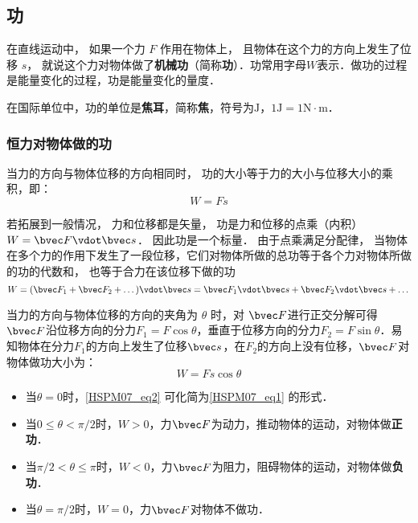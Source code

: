 
\begin{issues}
\issueDraft
\issueTODO
\end{issues}

\subsection{功}

在直线运动中， 如果一个力 $F$ 作用在物体上， 且物体在这个力的方向上发生了位移 $s$， 就说这个力对物体做了\textbf{机械功}（简称\textbf{功}）．功常用字母$W$表示．做功的过程是能量变化的过程，功是能量变化的量度．

在国际单位中，功的单位是\textbf{焦耳}，简称\textbf{焦}，符号为$\mathrm{J}$，$1\mathrm{J}=1\mathrm{N \cdot m}$．

\subsubsection{恒力对物体做的功}

当力的方向与物体位移的方向相同时， 功的大小等于力的大小与位移大小的乘积，即：
\begin{equation}\label{HSPM07_eq1}
W=Fs
\end{equation}

若拓展到一般情况， 力和位移都是矢量， 功是力和位移的点乘（内积） $W = \bvec F \vdot \bvec s$． 因此功是一个标量． 由于点乘满足分配律， 当物体在多个力的作用下发生了一段位移，它们对物体所做的总功等于各个力对物体所做的功的代数和， 也等于合力在该位移下做的功
\begin{equation}
W = (\bvec F_1 + \bvec F_2 + \dots)\vdot \bvec s = \bvec F_1 \vdot \bvec s + \bvec F_2 \vdot \bvec s + \dots
\end{equation}

当力的方向与物体位移的方向的夹角为 $\theta$ 时，对 $\bvec F$进行正交分解可得$\bvec F$沿位移方向的分力$F_1=F\cos \theta$，垂直于位移方向的分力$F_2=F\sin \theta$．易知物体在分力$F_1$的方向上发生了位移$\bvec s$，在$F_2$的方向上没有位移，$\bvec F$对物体做功大小为：
\begin{equation}\label{HSPM07_eq2}
W=Fs\cos \theta
\end{equation}

\begin{itemize}
\item 当$\theta = 0$时，\autoref{HSPM07_eq2} 可化简为\autoref{HSPM07_eq1} 的形式．
\item 当$0\leq \theta < \pi/2$时，$W>0$，力$\bvec F$为动力，推动物体的运动，对物体做\textbf{正功}．
\item 当$\pi/2< \theta \leq \pi$时，$W<0$，力$\bvec F$为阻力，阻碍物体的运动，对物体做\textbf{负功}．
\item 当$\theta = \pi/2$时，$W=0$，力$\bvec F$对物体不做功．
\end{itemize}

